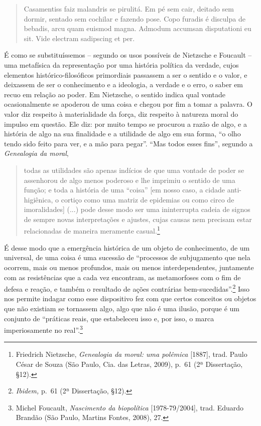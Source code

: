 \begin{quote}
Casamentiss faiz malandris se pirulitá. Em pé sem cair, deitado sem
dormir, sentado sem cochilar e fazendo pose. Copo furadis é disculpa de
bebadis, arcu quam euismod magna. Admodum accumsan disputationi eu sit.
Vide electram sadipscing et per.
\end{quote}

É como se substituíssemos -- segundo os usos possíveis de Nietzsche e
Foucault -- uma metafísica da representação por uma história política da
verdade, cujos elementos histórico-filosóficos primordiais passassem a
ser o sentido e o valor, e deixassem de ser o conhecimento e a
ideologia, a verdade e o erro, o saber em recuo em relação ao poder. Em
Nietzsche, o sentido indica qual vontade ocasionalmente se apoderou de
uma coisa e chegou por fim a tomar a palavra. O valor diz respeito à
materialidade da força, diz respeito à natureza moral do impulso em
questão. Ele diz: por muito tempo se procurou a razão de algo, e a
história de algo na sua finalidade e a utilidade de algo em sua forma,
``o olho tendo sido feito para ver, e a mão para pegar''. ``Mas todos
esses fins'', segundo a \emph{Genealogia da moral},

\begin{quote}
todas as utilidades são apenas indícios de que uma vontade de poder se
assenhorou de algo menos poderoso e lhe imprimiu o sentido de uma
função; e toda a história de uma ``coisa'' {[}em nosso caso, a cidade
anti-higiênica, o cortiço como uma matriz de epidemias ou como circo de
imoralidades{]} (...) pode desse modo ser uma ininterrupta cadeia de
signos de sempre novas interpretações e ajustes, cujas causas nem
precisam estar relacionadas de maneira meramente casual.\footnote{Friedrich
  Nietzsche, \emph{Genealogia da moral: uma polêmica} {[}1887{]}, trad.
  Paulo César de Souza (São Paulo, Cia. das Letras, 2009), p.~61 (2ª
  Dissertação, §12).}
\end{quote}

É desse modo que a emergência histórica de um objeto de conhecimento, de
um universal, de uma coisa é uma sucessão de ``processos de subjugamento
que nela ocorrem, mais ou menos profundos, mais ou menos
interdependentes, juntamente com as resistências que a cada vez
encontram, as metamorfoses com o fim de defesa e reação, e também o
resultado de ações contrárias bem-sucedidas''.\footnote{\emph{Ibidem,}
  p.~61 (2ª Dissertação, §12).} Isso nos permite indagar como esse
dispositivo fez com que certos conceitos ou objetos que não existiam se
tornassem algo, algo que não é uma ilusão, porque é um conjunto de
``práticas reais, que estabeleceu isso e, por isso, o marca
imperiosamente no real''.\footnote{Michel Foucault, \emph{Nascimento da
  biopolítica} {[}1978-79/2004{]}, trad. Eduardo Brandão (São Paulo,
  Martins Fontes, 2008), 27.}

